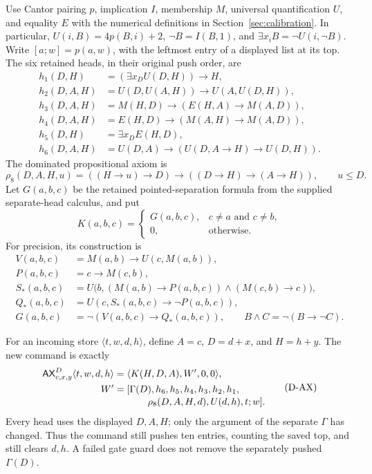Use Cantor pairing \(p\), implication \(I\), membership \(M\),
universal quantification \(U\), and equality \(E\) with the numerical
definitions in Section~\ref{sec:calibration}.  In particular,
\(U(i,B)=4p(B,i)+2\), \(\neg B=I(B,1)\), and
\(\exists x_i B=\neg U(i,\neg B)\).  Write \([a;w]=p(a,w)\),
with the leftmost entry of a displayed list at its top.  The six retained
heads, in their original push order, are
\begin{align*}
 h_1(D,H)&=(\exists x_D U(D,H))\to H,\\
 h_2(D,A,H)&=U(D,U(A,H))\to U(A,U(D,H)),\\
 h_3(D,A,H)&=M(H,D)\to(E(H,A)\to M(A,D)),\\
 h_4(D,A,H)&=E(H,D)\to(M(A,H)\to M(A,D)),\\
 h_5(D,H)&=\exists x_D E(H,D),\\
 h_6(D,A,H)&=U(D,A)\to(U(D,A\to H)\to U(D,H)).
\end{align*}
The dominated propositional axiom is
\[
 \rho_8(D,A,H,u)=((H\to u)\to D)
                         \to((D\to H)\to(A\to H)),\qquad u\le D.
\]
Let \(G(a,b,c)\) be the retained pointed-separation formula from the
supplied separate-head calculus, and put
\[
 K(a,b,c)=
 \begin{cases}G(a,b,c),&c\ne a\text{ and }c\ne b,\\
 0,&\text{otherwise}.
 \end{cases}
\]
For precision, its construction is
\begin{align*}
 V(a,b,c)&=M(a,b)\to U(c,M(a,b)),\\
 P(a,b,c)&=c\to M(c,b),\\
 S_*(a,b,c)&=U\bigl(b,(M(a,b)\to P(a,b,c))
                                \wedge(M(c,b)\to c)\bigr),\\
 Q_*(a,b,c)&=U(c,S_*(a,b,c)\to\neg P(a,b,c)),\\
 G(a,b,c)&=\neg(V(a,b,c)\to Q_*(a,b,c)),
 \qquad B\wedge C=\neg(B\to\neg C).
\end{align*}

For an incoming store \(\langle t,w,d,h\rangle\), define
\(A=c\), \(D=d+x\), and \(H=h+y\).  The new command is exactly
\[
\begin{aligned}
 \mathsf{AX}^{D}_{c,x,y}\langle t,w,d,h\rangle
   &=\langle K(H,D,A),W',0,0\rangle,\\
 W'&=[\Gamma(D),h_6,h_5,h_4,h_3,h_2,h_1,\\[-2pt]
    &\hspace{3.5em}\rho_8(D,A,H,d),U(d,h),t;w].
\end{aligned}
\tag{D-AX}\label{eq:gammad-ax}
\]
Every head uses the displayed \(D,A,H\); only the argument of the
separate \(\Gamma\) has changed.  Thus the command still pushes ten
entries, counting the saved top, and still clears \(d,h\).
A failed gate guard does not remove the separately pushed
\(\Gamma(D)\).

